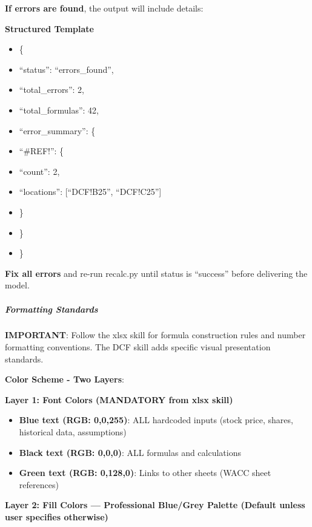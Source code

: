 \documentclass[11pt]{article}
\begin{document}
\textbf{If errors are found}, the output will include details:

\textbf{Structured Template}
\begin{itemize}[leftmargin=*,itemsep=2pt,topsep=2pt]
\item {} \{
\item {} ``status'': ``errors\_\allowbreak{}found'',
\item {} ``total\_\allowbreak{}errors'': 2,
\item {} ``total\_\allowbreak{}formulas'': 42,
\item {} ``error\_\allowbreak{}summary'': \{
\item {} ``\#REF!'': \{
\item {} ``count'': 2,
\item {} ``locations'': [``DCF!B25'', ``DCF!C25'']
\item {} \}
\item {} \}
\item {} \}
\end{itemize}

\textbf{Fix all errors} and re-run recalc.py until status is ``success'' before delivering the model.


\subparagraph{Formatting Standards}\mbox{}\par

\textbf{IMPORTANT}: Follow the xlsx skill for formula construction rules and number formatting conventions. The DCF skill adds specific visual presentation standards.


\textbf{Color Scheme - Two Layers}:


\textbf{Layer 1: Font Colors (MANDATORY from xlsx skill)}

\begin{itemize}[leftmargin=*,itemsep=2pt,topsep=2pt]
\item {} \textbf{Blue text (RGB: 0,0,255)}: ALL hardcoded inputs (stock price, shares, historical data, assumptions)
\item {} \textbf{Black text (RGB: 0,0,0)}: ALL formulas and calculations
\item {} \textbf{Green text (RGB: 0,128,0)}: Links to other sheets (WACC sheet references)
\end{itemize}

\textbf{Layer 2: Fill Colors — Professional Blue/Grey Palette (Default unless user specifies otherwise)}
\end{document}
